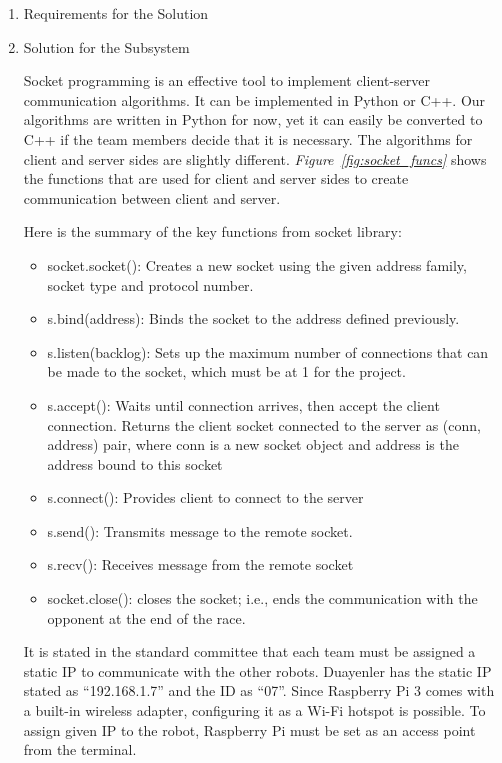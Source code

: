 \documentclass[a4paper,12pt]{article}
\begin{document}
		\begin{enumerate}
			\item {Requirements for the Solution}
			
			\item {Solution for the Subsystem}
			
			Socket programming is an effective tool to implement client-server communication algorithms. It can be implemented in Python or C++.  Our algorithms are written in Python for now, yet it can easily be converted to C++ if the team members decide that it is necessary. The algorithms for client and server sides are slightly different. \textit{Figure~\ref{fig:socket_funcs}} shows the functions that are used for client and server sides to create communication between client and server.
	
	
	
	Here is the summary of the key functions from socket library:
	
	\begin{itemize}
		\item socket.socket(): Creates a new socket using the given address family, socket type and protocol number.
		\item s.bind(address): Binds the socket to the address defined previously.
		\item s.listen(backlog): Sets up the maximum number of connections that can be made to the socket, which must be at 1 for the project.
		\item	s.accept(): Waits until connection arrives, then accept the client connection. Returns the client socket connected to the server as (conn, address) pair, where conn is a new socket object and address is the address bound to this socket
		\item	s.connect(): Provides client to connect to the server
		\item	s.send(): Transmits message to the remote socket.
		\item	s.recv(): Receives message from the remote socket
		\item	socket.close(): closes the socket; i.e., ends the communication with the opponent at the end of the race.
	\end{itemize}
	
	It is stated in the standard committee that each team must be assigned a static IP to communicate with the other robots. Duayenler has the static IP stated as “192.168.1.7” and the ID as “07”. Since Raspberry Pi 3 comes with a built-in wireless adapter, configuring it as a Wi-Fi hotspot is possible. To assign given IP to the robot, Raspberry Pi must be set as an access point from the terminal.\\
	

\end{enumerate}
\end{document}
